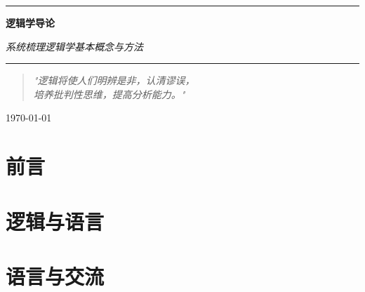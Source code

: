 \documentclass[a4paper,11pt,twoside]{book}
\begin{document}
\begin{titlepage}
\centering
\vspace*{2cm}
{\color{black!80}\rule{\textwidth}{1pt}}
\vspace{1.5cm}

{\Huge\bfseries\color{black!90} 逻辑学导论 \par}
\vspace{0.5cm}
{\large\itshape 系统梳理逻辑学基本概念与方法 \par}

\vspace{1.5cm}
{\color{black!80}\rule{\textwidth}{1pt}}
\vspace{2cm}

\begin{minipage}{0.8\textwidth}
\centering
\begin{quotation}
\large\textit{"逻辑将使人们明辨是非，认清谬误，\\
培养批判性思维，提高分析能力。"}
\end{quotation}
\end{minipage}

\vfill

{\large \today \par}
\end{titlepage}

\frontmatter
\chapter*{前言}


\tableofcontents
\clearpage

\mainmatter

\chapter{逻辑与语言}













\chapter{语言与交流}







\end{document}
